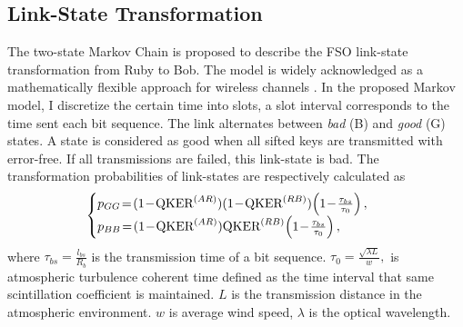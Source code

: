 \documentclass[conference]{IEEEtran}
\begin{document}
\subsection{Link-State Transformation}
The two-state Markov Chain is proposed to describe the FSO link-state transformation from Ruby to Bob. The model is widely acknowledged as a mathematically flexible approach for wireless channels \cite{Shen2006}. In the proposed Markov model, I discretize the certain time into slots, a slot interval corresponds to the time sent each bit sequence. The link alternates between \textit{bad} (B) and \textit{good} (G) states. A state is considered as good when all sifted keys are transmitted with error-free. If all transmissions are failed, this link-state is bad. The transformation probabilities of link-states are respectively calculated as
\begin{equation}
\!\!
  \begin{cases}
    p_{GG}\!=\!(1\!-\!\textnormal{QKER}^{(AR)})(1\!-\!\textnormal{QKER}^{(RB)})\!\left ( 1\!-\!\frac{\tau _{bs}}{\tau _0} \right ),\\
    p_{BB}\!=\!(1\!-\!\textnormal{QKER}^{(AR)})\textnormal{QKER}^{(RB)}\!\left ( 1\!-\!\frac{\tau _{bs}}{\tau _0} \right ),\\
  \end{cases}
\end{equation}
where $\tau_{bs}=\frac{l_{bs}}{R_b}$ is the transmission time of a bit sequence. $\tau_0=\frac{\sqrt{\lambda L}}{w},$ is atmospheric turbulence coherent time defined as the time interval that same scintillation coefficient is maintained. $L$ is the transmission distance in the atmospheric environment. $w$ is average wind speed, $\lambda$ is the optical wavelength. 
\end{document}
